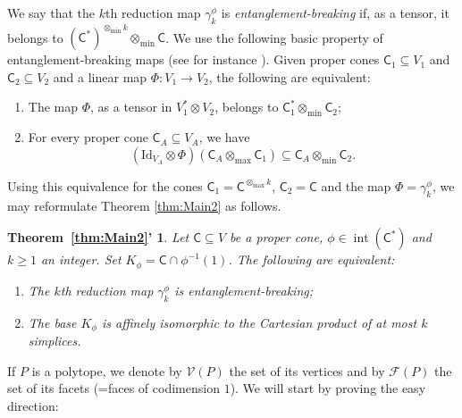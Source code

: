 \documentclass{amsart}
\renewcommand{\geq}{\geqslant}
\renewcommand{\subset}{\subseteq}
\newcommand{\gC}{\mathsf{C}}
\newcommand{\Id}{\mathrm{Id}}
\DeclareMathOperator{\inter}{int}
\theoremstyle{plain}
\newcommand{\tmin}{{\otimes_{\min}}}
\newcommand{\tmax}{{\otimes_{\max}}}
\begin{document}
We say that the $k$th reduction map $\gamma_k^\phi$ is \emph{entanglement-breaking} if, as a tensor, it belongs to $(\gC^*)^{\tmin k} \tmin  \gC$. We use the following basic property of entanglement-breaking maps (see for instance \cite[Proposition 2.2]{AMH22}). Given proper cones $\gC_1 \subset V_1$ and $\gC_2 \subset V_2$ and a linear map $\Phi : V_1 \to V_2$, the following are equivalent:
\begin{enumerate}
\item[(i)] The map $\Phi$, as a tensor in $V_1^* \otimes V_2$, belongs to $\gC_1^* \tmin \gC_2$;
\item[(ii)] For every proper cone $\gC_A \subset V_A$, we have 
\[(\Id_{V_A} \otimes \Phi)(\gC_A \tmax \gC_1) \subset \gC_A \tmin \gC_2.\]
\end{enumerate}
Using this equivalence for the cones $\gC_1 = \gC^{\tmax k}$, $\gC_2 = \gC$ and the map $\Phi = \gamma_k^\phi$, we may reformulate Theorem \ref{thm:Main2} as follows.

\newtheorem*{theorem:restated}{Theorem~\ref{thm:Main2}'}

\begin{theorem:restated}
Let $\gC \subset V$ be a proper cone, $\phi \in \inter (\gC^*)$ and $k \geq 1$ an integer. Set $K_\phi = \gC \cap \phi^{-1}(1)$. The following are equivalent:
\begin{enumerate}
\item[(i)] The $k$th reduction map $\gamma_k^\phi$ is entanglement-breaking;
\item[(ii)] The base $K_\phi$ is affinely isomorphic to the Cartesian product of at most $k$ simplices.
\end{enumerate}
\end{theorem:restated}

If $P$ is a polytope, we denote by $\mathcal{V}(P)$ the set of its vertices and by $\mathcal{F}(P)$ the set of its facets (=faces of codimension $1$). We will start by proving the easy direction:
\end{document}
